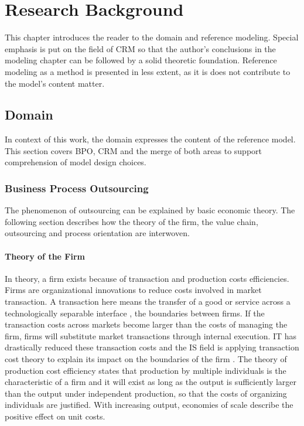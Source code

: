 
\chapter{Research Background}
	This chapter introduces the reader to the domain and reference modeling. Special emphasis is put on the field of \acrshort{CRM} so that the author's conclusions in the modeling chapter can be followed by a solid theoretic foundation. Reference modeling as a method is presented in less extent, as it is does not contribute to the model's content matter.
	
	\section{Domain}
	In context of this work, the domain expresses the content of the reference model. This section covers \acrshort{BPO}, \acrshort{CRM} and the merge of both areas to support comprehension of model design choices.
		\subsection{Business Process Outsourcing}
		The phenomenon of outsourcing can be explained by basic economic theory. The following section describes how the theory of the firm, the value chain, outsourcing and process orientation are interwoven. 
		
		
		\subsubsection{Theory of the Firm}
		In theory, a firm exists because of transaction and production costs efficiencies. Firms are organizational innovations to reduce costs involved in market transaction. A transaction here means the transfer of a good or service across a technologically separable interface \citep{williamson1981economics, williamson1971vertical}, \eg the boundaries between firms. If the transaction costs across markets become larger than the costs of managing the firm, firms will substitute market transactions through internal execution. IT has drastically reduced these transaction costs and the IS field is applying transaction cost theory to explain its impact on the boundaries of the firm \citep{aron2005just}.
		The theory of production cost efficiency states that production by multiple individuals is the characteristic of a firm \citep{alchian1972production} and it will exist as long as the output is sufficiently larger than the output under independent production, so that the costs of organizing individuals are justified. With increasing output, economies of scale describe the positive effect on unit costs. 
		
